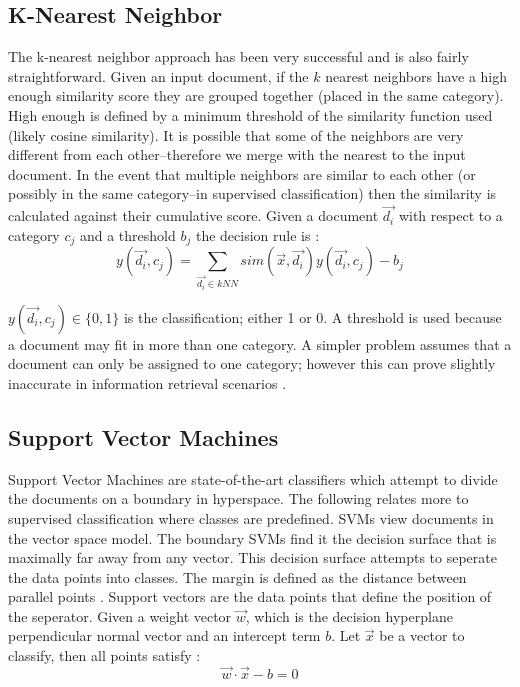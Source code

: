 \documentclass[11pt,twocolumn]{article}
\begin{document}
\subsection{K-Nearest Neighbor}
The k-nearest neighbor approach has been very successful and is also fairly straightforward.  Given an input document, if the $k$ nearest neighbors have a high enough similarity score they are grouped together (placed in the same category).  High enough is defined by a minimum threshold of the similarity function used (likely cosine similarity).  It is possible that some of the neighbors are very different from each other--therefore we merge with the nearest to the input document.  In the event that multiple neighbors are similar to each other (or possibly in the same category--in supervised classification) then the similarity is calculated against their cumulative score.  Given a document $\vec{d_i}$ with respect to a category $c_j$ and a threshold $b_j$ the decision rule is \cite{Yang1999}:
\begin{equation*}
 y(\vec{d_i},c_j) = \sum_{\vec{d_i} \in kNN} sim(\vec{x},\vec{d_i})y(\vec{d_i},c_j) - b_j
\end{equation*}

$y(\vec{d_i},c_j) \in \{0, 1\}$ is the classification; either 1 or 0.  A threshold is used because a document may fit in more than one category.  A simpler problem assumes that a document can only be assigned to one category; however this can prove slightly inaccurate in information retrieval scenarios \cite{Yang1999}.

\subsection{Support Vector Machines}
Support Vector Machines are state-of-the-art classifiers which attempt to divide the documents on a boundary in hyperspace.  The following relates more to supervised classification where classes are predefined.  SVMs view documents in the vector space model.  The boundary SVMs find it the decision surface that is maximally far away from any vector.  This decision surface attempts to seperate the data points into classes.  The margin is defined as the distance between parallel points \cite{Mann2008, Yang1999}.  Support vectors are the data points that define the position of the seperator.  Given a weight vector $\vec{w}$, which is the decision hyperplane perpendicular normal vector and an intercept term $b$.  Let $\vec{x}$ be a vector to classify, then all points satisfy \cite{Mann2008}:
\begin{equation*}
\vec{w}\cdot\vec{x} -b = 0
\end{equation*}
\end{document}
